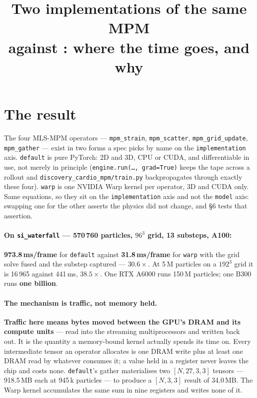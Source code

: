 \documentclass[11pt,a4paper]{article}
\title{\vspace{-1.6cm}\textbf{Two implementations of the same MPM}\\[3pt]
\large \code{default} against \code{warp}: where the time goes, and why}
\author{}
\date{}
\newcommand{\code}[1]{\texttt{\small #1}}
\newcommand{\gd}[1]{\textcolor{good}{\textbf{#1}}}
\newcommand{\bd}[1]{\textcolor{bad}{\textbf{#1}}}
\begin{document}
\maketitle
\vspace{-1.1cm}

\section{The result}

The four MLS-MPM operators --- \code{mpm\_strain}, \code{mpm\_scatter}, \code{mpm\_grid\_update},
\code{mpm\_gather} --- exist in two forms a spec picks by name on the \code{implementation} axis.
\code{default} is pure PyTorch: 2D and 3D, CPU or CUDA, and differentiable in use, not merely in
principle (\code{engine.run(\ldots, grad=True)} keeps the tape across a rollout and
\code{discovery\_cardio\_mpm/train.py} backpropagates through exactly these four). \code{warp} is
one NVIDIA Warp kernel per operator, 3D and CUDA only. Same equations, so they sit on the
\code{implementation} axis and not the \code{model} axis: swapping one for the other asserts the
physics did not change, and \S6 tests that assertion.

\paragraph{On \code{si\_waterfall} --- 570\,760 particles, $96^3$ grid, 13 substeps, A100:}
\bd{973.8\,ms/frame} for \code{default} against \gd{31.8\,ms/frame} for \code{warp} with the grid
solve fused and the substep captured --- \gd{$30.6\times$}. At 5\,M particles on a $192^3$ grid it is
16\,965 against 441\,ms, \gd{$38.5\times$}. One RTX A6000 runs 150\,M particles; one B300 runs
\gd{one billion}.

\paragraph{The mechanism is traffic, not memory held.} \textbf{Traffic here means bytes moved
between the GPU's DRAM and its compute units} --- read into the streaming multiprocessors and written
back out. It is the quantity a memory-bound kernel actually spends its time on. Every intermediate
tensor an operator allocates is one DRAM write plus at least one DRAM read by whatever consumes it;
a value held in a register never leaves the chip and costs none. \code{default}'s gather materialises
two $[N,27,3,3]$ tensors --- 918.5\,MB each at 945\,k particles --- to produce a $[N,3,3]$ result of
34.0\,MB. The Warp kernel accumulates the same sum in nine registers and writes none of it.
\end{document}
